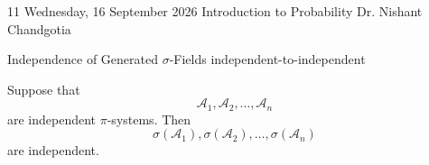 
\lecture
{11}
{Wednesday, 16 September 2026}
{Introduction to Probability}
{Dr. Nishant Chandgotia}


\begin{theorem}{Independence of Generated $\sigma$-Fields}
{independent-to-independent}

Suppose that
\[
\mathcal{A}_1,\mathcal{A}_2,\ldots,\mathcal{A}_n
\]
are independent $\pi$-systems. Then
\[
\sigma(\mathcal{A}_1),\sigma(\mathcal{A}_2),
\ldots,\sigma(\mathcal{A}_n)
\]
are independent.

\end{theorem}

